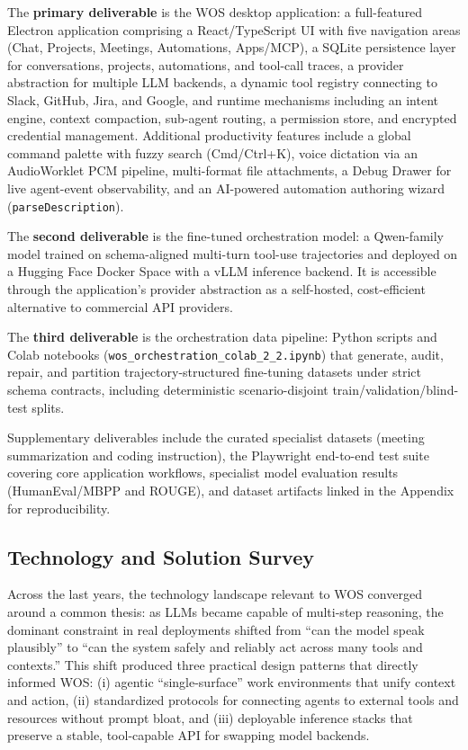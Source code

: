 \documentclass[conference]{IEEEtran}
\begin{document}
The \textbf{primary deliverable} is the WOS desktop application: a full-featured Electron application comprising a React/TypeScript UI with five navigation areas (Chat, Projects, Meetings, Automations, Apps/MCP), a SQLite persistence layer for conversations, projects, automations, and tool-call traces, a provider abstraction for multiple LLM backends, a dynamic tool registry connecting to Slack, GitHub, Jira, and Google, and runtime mechanisms including an intent engine, context compaction, sub-agent routing, a permission store, and encrypted credential management. Additional productivity features include a global command palette with fuzzy search (Cmd/Ctrl+K), voice dictation via an AudioWorklet PCM pipeline, multi-format file attachments, a Debug Drawer for live agent-event observability, and an AI-powered automation authoring wizard (\texttt{parseDescription}).

The \textbf{second deliverable} is the fine-tuned orchestration model: a Qwen-family model trained on schema-aligned multi-turn tool-use trajectories and deployed on a Hugging Face Docker Space with a vLLM inference backend. It is accessible through the application's provider abstraction as a self-hosted, cost-efficient alternative to commercial API providers.

The \textbf{third deliverable} is the orchestration data pipeline: Python scripts and Colab notebooks (\texttt{wos\_orchestration\_colab\_2\_2.ipynb}) that generate, audit, repair, and partition trajectory-structured fine-tuning datasets under strict schema contracts, including deterministic scenario-disjoint train/validation/blind-test splits.

Supplementary deliverables include the curated specialist datasets (meeting summarization and coding instruction), the Playwright end-to-end test suite covering core application workflows, specialist model evaluation results (HumanEval/MBPP and ROUGE), and dataset artifacts linked in the Appendix for reproducibility.
\subsection{Technology and Solution Survey}
Across the last years, the technology landscape relevant to WOS converged around a common thesis: as LLMs became capable of multi-step reasoning, the dominant constraint in real deployments shifted from “can the model speak plausibly” to “can the system safely and reliably act across many tools and contexts.” This shift produced three practical design patterns that directly informed WOS: (i) agentic “single-surface” work environments that unify context and action, (ii) standardized protocols for connecting agents to external tools and resources without prompt bloat, and (iii) deployable inference stacks that preserve a stable, tool-capable API for swapping model backends.
\end{document}
